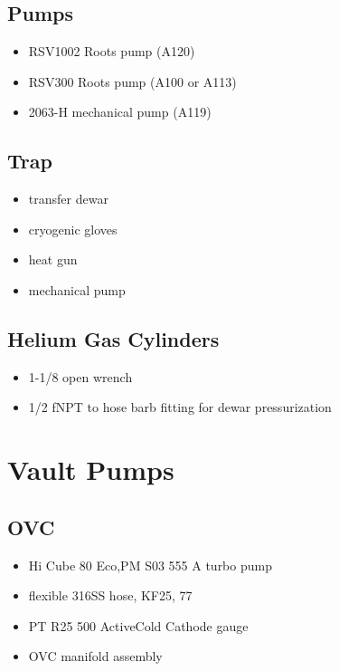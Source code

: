   \subsection{\hef{} Pumps}
\begin{itemize}
 \item {} RSV1002 Roots pump (A120)
 \item {} RSV300 Roots pump (A100 or A113)
 \item {} 2063-H mechanical pump (A119)
\end{itemize}

  \subsection{\lnn{} Trap}
\begin{itemize}
 \item \lnn{} transfer dewar
\item cryogenic gloves
\item heat gun
\item mechanical pump
\end{itemize}

  \subsection{Helium Gas Cylinders}
\begin{itemize}
 \item 1-1/8\inches{} open wrench
 \item 1/2\inches{} fNPT to hose barb fitting for dewar pressurization
\end{itemize}


  
\section{Vault Pumps}
  \subsection{OVC}
\begin{itemize}
 \item {} Hi Cube 80 Eco,PM S03 555 A turbo pump
\item {} flexible 316SS hose, KF25, 77\inches
\item {} PT R25 500 ActiveCold Cathode gauge
\item OVC manifold assembly
\end{itemize}

